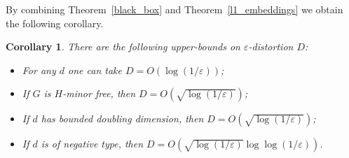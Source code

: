 \documentclass[12pt]{article}
\newcommand{\eps}{\varepsilon}
\newtheorem{corollary}{Corollary}
\begin{document}
    By combining Theorem~\ref{black_box} and Theorem~\ref{l1_embeddings} we obtain the following corollary.
    \begin{corollary}
        There are the following upper-bounds on $\eps$-distortion $D$:
        \begin{itemize}
            \item For any $d$ one can take $D = O(\log (1 / \eps))$;
            \item If $G$ is $H$-minor free, then $D = O(\sqrt{\log (1 / \eps)})$; 
            \item If $d$ has bounded doubling dimension, then $D = O(\sqrt{\log (1 / \eps)})$;
            \item If $d$ is of negative type, then $D = O(\sqrt{\log (1 / \eps)} \log \log (1 / \eps))$. 
        \end{itemize}
    \end{corollary}

    
    
\end{document}
